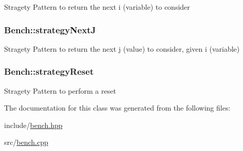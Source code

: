 \-Stragety \-Pattern to return the next i (variable) to consider \hypertarget{classBench_a4a1797a7ffaa0ce346274ac63f2379b3}{
\subsubsection[{strategy\-Next\-J}]{ {\bf \-Bench\-::strategy\-Next\-J}}}\label{classBench_a4a1797a7ffaa0ce346274ac63f2379b3}
\-Stragety \-Pattern to return the next j (value) to consider, given i (variable) \hypertarget{classBench_a88dbf079cc6c2392132efc8038b88443}{
\subsubsection[{strategy\-Reset}]{ {\bf \-Bench\-::strategy\-Reset}}}\label{classBench_a88dbf079cc6c2392132efc8038b88443}
\-Stragety \-Pattern to perform a reset 

\-The documentation for this class was generated from the following files\-:\begin{DoxyCompactItemize}
\item 
include/\hyperlink{bench_8hpp}{bench.\-hpp}\item 
src/\hyperlink{bench_8cpp}{bench.\-cpp}\end{DoxyCompactItemize}
